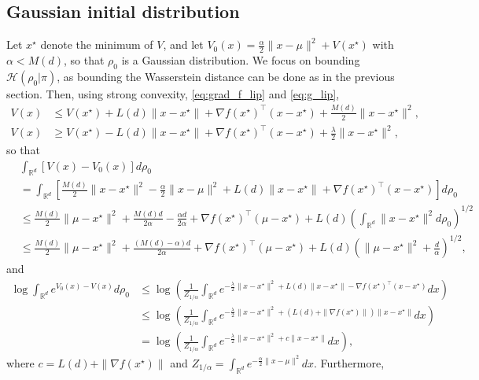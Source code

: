 \documentclass[final,12pt]{colt2018}
\begin{document}
\subsection{Gaussian initial distribution}
Let $x^\star$ denote the minimum of $V$, and let $V_0(x) = \frac{\alpha}{2}\|x-\mu\|^2 + V(x^\star)$ with $\alpha < M(d)$, so that $\rho_0$ is a Gaussian distribution. We focus on bounding $\mathcal{H}(\rho_0 | \pi)$, as bounding the Wasserstein distance can be done as in the previous section. Then, using strong convexity,  \eqref{eq:grad_f_lip} and \eqref{eq:g_lip},
\begin{align*}
V(x) &\leq V(x^\star) + L(d)\|x - x^\star\| +\nabla f(x^\star)^\top(x-x^\star) + \frac{M(d)}{2}\|x-x^\star\|^2, \\
V(x) &\geq V(x^\star) - L(d)\|x - x^\star\| +\nabla f(x^\star)^\top(x-x^\star) + \frac{\lambda}{2}\|x-x^\star\|^2,
\end{align*}
so that
\begin{align*}
&\int_{\mathbb{R}^d} \left[V(x) - V_0(x)\right]d\rho_0 \\
&= \int_{\mathbb{R}^d} \left[ \frac{M(d)}{2}\|x-x^\star\|^2 - \frac{\alpha}{2}\|x-\mu\|^2 + L(d)\|x - x^\star\| +\nabla f(x^\star)^\top(x-x^\star) \right]d\rho_0\\
&\leq  \frac{M(d)}{2}\|\mu-x^\star\|^2 +  \frac{M(d) d}{2\alpha} - \frac{\alpha d}{2\alpha} +\nabla f(x^\star)^\top(\mu-x^\star) + L(d)\left(\int_{\mathbb{R}^d} \|x - x^\star\|^2 d\rho_0\right)^{1/2}  \\
&\leq  \frac{M(d)}{2}\|\mu-x^\star\|^2 +  \frac{(M(d)-\alpha) d}{2\alpha} +\nabla f(x^\star)^\top(\mu-x^\star) + L(d)\left(\|\mu-x^\star\|^2 +\frac{d}{\alpha}\right)^{1/2}, 
\end{align*}
and
\begin{align*}
\log \int_{\mathbb{R}^d} e^{V_0(x) - V(x)} d\rho_0 &\leq \log\left(\frac{1}{Z_{1/\alpha}} \int_{\mathbb{R}^d} e^{-\frac{\lambda}{2}\|x-x^\star\|^2+L(d)\|x - x^\star\| - \nabla f(x^\star)^\top(x-x^\star)} dx \right)\\
&\leq \log\left(\frac{1}{Z_{1/\alpha}} \int_{\mathbb{R}^d} e^{-\frac{\lambda}{2}\|x-x^\star\|^2+(L(d)+\|\nabla f(x^\star)\|)\|x - x^\star\|} dx \right)\\
&=\log\left(\frac{1}{Z_{1/\alpha}} \int_{\mathbb{R}^d} e^{-\frac{\lambda}{2}\|x-x^\star\|^2+ c\|x - x^\star\|} dx \right),
\end{align*}
where $c = L(d)+\|\nabla f(x^\star)\|$ and $Z_{1/\alpha} = \int_{\mathbb{R}^d} e^{-\frac{\alpha}{2}\|x-\mu\|^2}dx$. Furthermore,
\end{document}
